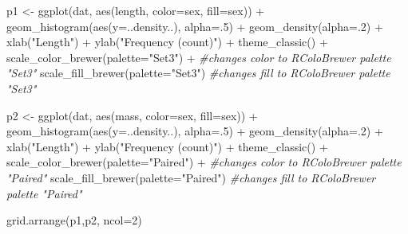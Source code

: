\documentclass[
]{book}
\newenvironment{Shaded}{\begin{snugshade}}{\end{snugshade}}
\newcommand{\AttributeTok}[1]{\textcolor[rgb]{0.77,0.63,0.00}{#1}}
\newcommand{\CommentTok}[1]{\textcolor[rgb]{0.56,0.35,0.01}{\textit{#1}}}
\newcommand{\DecValTok}[1]{\textcolor[rgb]{0.00,0.00,0.81}{#1}}
\newcommand{\FunctionTok}[1]{\textcolor[rgb]{0.00,0.00,0.00}{#1}}
\newcommand{\NormalTok}[1]{#1}
\newcommand{\OtherTok}[1]{\textcolor[rgb]{0.56,0.35,0.01}{#1}}
\newcommand{\SpecialCharTok}[1]{\textcolor[rgb]{0.00,0.00,0.00}{#1}}
\newcommand{\StringTok}[1]{\textcolor[rgb]{0.31,0.60,0.02}{#1}}
\begin{document}
\begin{Shaded}
\begin{Highlighting}[]
\NormalTok{p1 }\OtherTok{\textless{}{-}} \FunctionTok{ggplot}\NormalTok{(dat, }\FunctionTok{aes}\NormalTok{(length, }\AttributeTok{color=}\NormalTok{sex, }\AttributeTok{fill=}\NormalTok{sex)) }\SpecialCharTok{+}
    \FunctionTok{geom\_histogram}\NormalTok{(}\FunctionTok{aes}\NormalTok{(}\AttributeTok{y=}\NormalTok{..density..), }\AttributeTok{alpha=}\NormalTok{.}\DecValTok{5}\NormalTok{) }\SpecialCharTok{+}
    \FunctionTok{geom\_density}\NormalTok{(}\AttributeTok{alpha=}\NormalTok{.}\DecValTok{2}\NormalTok{) }\SpecialCharTok{+} 
    \FunctionTok{xlab}\NormalTok{(}\StringTok{"Length"}\NormalTok{) }\SpecialCharTok{+}
    \FunctionTok{ylab}\NormalTok{(}\StringTok{"Frequency (count)"}\NormalTok{) }\SpecialCharTok{+}
    \FunctionTok{theme\_classic}\NormalTok{() }\SpecialCharTok{+}
    \FunctionTok{scale\_color\_brewer}\NormalTok{(}\AttributeTok{palette=}\StringTok{"Set3"}\NormalTok{) }\SpecialCharTok{+} \CommentTok{\#changes color to RColoBrewer palette "Set3"}
    \FunctionTok{scale\_fill\_brewer}\NormalTok{(}\AttributeTok{palette=}\StringTok{"Set3"}\NormalTok{) }\CommentTok{\#changes fill to RColoBrewer palette "Set3"}

\NormalTok{p2 }\OtherTok{\textless{}{-}} \FunctionTok{ggplot}\NormalTok{(dat, }\FunctionTok{aes}\NormalTok{(mass, }\AttributeTok{color=}\NormalTok{sex, }\AttributeTok{fill=}\NormalTok{sex)) }\SpecialCharTok{+}
    \FunctionTok{geom\_histogram}\NormalTok{(}\FunctionTok{aes}\NormalTok{(}\AttributeTok{y=}\NormalTok{..density..), }\AttributeTok{alpha=}\NormalTok{.}\DecValTok{5}\NormalTok{) }\SpecialCharTok{+}
    \FunctionTok{geom\_density}\NormalTok{(}\AttributeTok{alpha=}\NormalTok{.}\DecValTok{2}\NormalTok{) }\SpecialCharTok{+} 
    \FunctionTok{xlab}\NormalTok{(}\StringTok{"Length"}\NormalTok{) }\SpecialCharTok{+}
    \FunctionTok{ylab}\NormalTok{(}\StringTok{"Frequency (count)"}\NormalTok{) }\SpecialCharTok{+}
    \FunctionTok{theme\_classic}\NormalTok{() }\SpecialCharTok{+}
    \FunctionTok{scale\_color\_brewer}\NormalTok{(}\AttributeTok{palette=}\StringTok{"Paired"}\NormalTok{) }\SpecialCharTok{+} \CommentTok{\#changes color to RColoBrewer palette "Paired"}
    \FunctionTok{scale\_fill\_brewer}\NormalTok{(}\AttributeTok{palette=}\StringTok{"Paired"}\NormalTok{) }\CommentTok{\#changes fill to RColoBrewer palette "Paired"}

\FunctionTok{grid.arrange}\NormalTok{(p1,p2, }\AttributeTok{ncol=}\DecValTok{2}\NormalTok{)}
\end{Highlighting}
\end{Shaded}
\end{document}
